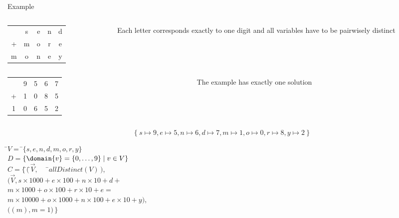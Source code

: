 \begin{frame}{Example}
  \begin{columns}
    \begin{column}{.35\textwidth}
      \begin{tabular}[t]{ccccc}
         &s&e&n&d\\
        +&m&o&r&e\\
        \hline
        m&o&n&e&y
      \end{tabular}
    \end{column}
    \begin{column}{.35\textwidth}
      Each letter corresponds exactly to one digit and all variables have to be
      pairwisely distinct
    \end{column}
  \end{columns}
\pause
\bigskip\bigskip
{}
{%

  \begin{columns}
    \begin{column}{.35\textwidth}
      \begin{tabular}[t]{ccccc}
         &9&5&6&7\\
        +&1&0&8&5\\
        \hline
        1&0&6&5&2
      \end{tabular}
    \end{column}
    \begin{column}{.35\textwidth}
      The example has exactly one solution
    \end{column}
  \end{columns}
\[
\{\ s\mapsto9, e\mapsto5, n\mapsto6, d\mapsto7, m\mapsto1, o\mapsto0, r\mapsto8, y\mapsto2\ \}
\]
}{%
\begin{tabbing}
 \qquad
 \=$V =\;$\=$\{s,e,n,d,m,o,r,y\}$\\[5pt]
 \>$D =$\>$\{\domain{v}= \{0,\dots,9\}\mid v \in V\}$\\[5pt]
 \>$C =$\>$\{\,$\=$(\,$\=$\vec{V},$~~~\=$allDistinct(V)\,)$,\\
 \>\>\>$($\>$\vec{V},$\>$s\times1000+e\times100+n\times10+d +$\\
 \>\>\>\>\>$m\times1000+o\times100+r\times10+e =$\\
 \>\>\>\>\>$m\times10000+o\times1000+n\times100+e\times10+y),$\\
 \>\>\>$($\>$(m),$\>$ m = 1)\,\}$\\
\end{tabbing}}
\end{frame}
